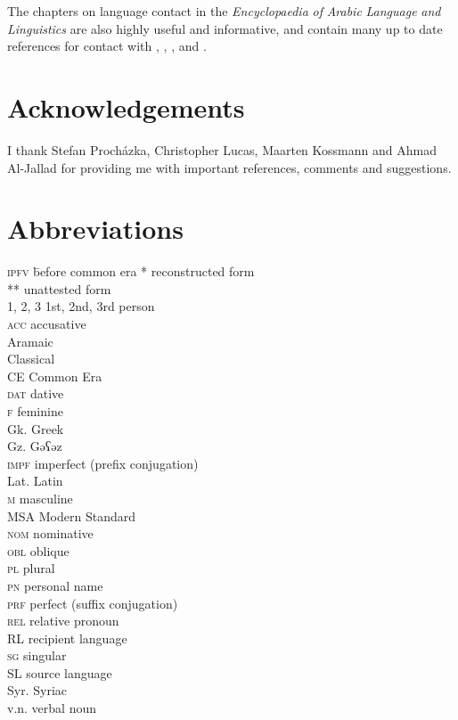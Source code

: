 \documentclass[output=paper]{langsci/langscibook}
\begin{document}
The chapters on language contact in the \textit{Encyclopaedia} \textit{of} \textit{Arabic} \textit{Language} \textit{and} \textit{Linguistics} are also highly useful and informative, and contain many up to date references for contact with  \citep{Gutas2011},  \citep{Asbaghi2011},  \cite{Retsö2011}, and  \citep{Procházka2011Turkish}.

\section*{Acknowledgements}
I thank Stefan Procházka, Christopher Lucas, Maarten Kossmann and Ahmad Al-Jallad for providing me with important references, comments and suggestions.

\section*{Abbreviations}
\begin{multicols}{2}
\begin{tabbing}
\textsc{ipfv} \hspace{1em} \= before common era\kill
*             \>  reconstructed form\\
**            \>  unattested form\\
\textsc {1, 2, 3} \> 1st, 2nd, 3rd person \\
\textsc{acc}  \>  accusative\\
         \>  Aramaic\\
            \>  Classical \\
CE            \>  Common Era\\
\textsc{dat}  \>  dative\\
\textsc{f}    \>  feminine\\
Gk.          \>  Greek\\
Gz.           \>  Gəʕəz\\
\textsc{impf} \>  imperfect (prefix conjugation)\\
Lat.         \>  Latin\\
\textsc{m}    \>  masculine\\
MSA           \>  Modern Standard \\
\textsc{nom}  \>  nominative\\
\textsc{obl}  \>  oblique\\
\textsc{pl}   \>  plural\\
\textsc{pn}   \> personal name\\
\textsc{prf}  \>  perfect (suffix conjugation)\\
\textsc{rel}  \>  {relative} pronoun\\
{RL}          \>  {recipient language}\\
\textsc{sg}   \>  singular\\
{SL}          \>  {source language}\\
Syr.          \>  Syriac\\
v.n.         \>  verbal noun
\end{tabbing}
\end{multicols}


{\sloppy\printbibliography[heading=subbibliography,notkeyword=this]}
\end{document}
